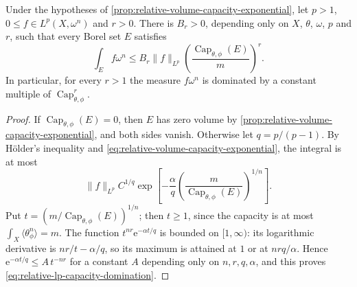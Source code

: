 \begin{corollary}\label{cor:relative-lp-capacity-domination}
Under the hypotheses of \cref{prop:relative-volume-capacity-exponential}, let $p>1$, $0\leq f\in L^p(X,\omega^n)$ and $r>0$. There is $B_r>0$, depending only on $X$, $\theta$, $\omega$, $p$ and $r$, such that every Borel set $E$ satisfies
\begin{equation}\label{eq:relative-lp-capacity-domination}
 \int_E f\omega^n\leq B_r\|f\|_{L^p}
           \left(\frac{\operatorname{Cap}_{\theta,\phi}(E)}m\right)^r.
\end{equation}
In particular, for every $r>1$ the measure $f\omega^n$ is dominated by a constant multiple of $\operatorname{Cap}_{\theta,\phi}^r$.
\end{corollary}
\begin{proof}
If $\operatorname{Cap}_{\theta,\phi}(E)=0$, then $E$ has zero volume by \cref{prop:relative-volume-capacity-exponential}, and both sides vanish. Otherwise let $q=p/(p-1)$. By H\"older's inequality and \eqref{eq:relative-volume-capacity-exponential}, the integral is at most
\[
 \|f\|_{L^p}C^{1/q}\exp\left[-\frac\alpha q
       \left(\frac{m}{\operatorname{Cap}_{\theta,\phi}(E)}\right)^{1/n}\right].
\]
Put $t=(m/\operatorname{Cap}_{\theta,\phi}(E))^{1/n}$; then $t\geq1$, since the capacity is at most $\int_X\langle\theta_\phi^n\rangle=m$. The function $t^{nr}\mathrm e^{-\alpha t/q}$ is bounded on $[1,\infty)$: its logarithmic derivative is $nr/t-\alpha/q$, so its maximum is attained at $1$ or at $nrq/\alpha$. Hence $\mathrm e^{-\alpha t/q}\leq A\,t^{-nr}$ for a constant $A$ depending only on $n,r,q,\alpha$, and this proves \eqref{eq:relative-lp-capacity-domination}.
\end{proof}


